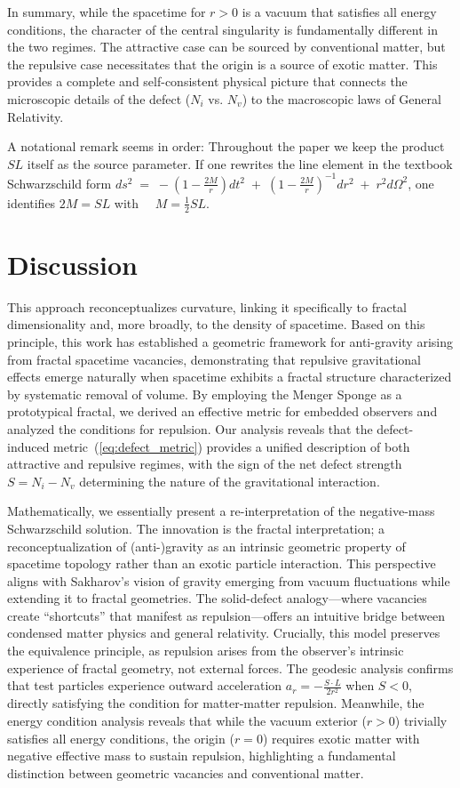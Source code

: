 \documentclass[%
  reprint,
  superscriptaddress,
  showpacs,
  showkeys,
  amsmath,amssymb,
  pra,
  longbibliography,
  floatfix,
  x11names
]{revtex4-2}
\begin{document}
In summary, while the spacetime for $r>0$ is a vacuum that satisfies all energy conditions, the character of the central singularity is fundamentally different in the two regimes. The attractive case can be sourced by conventional matter, but the repulsive case necessitates that the origin is a source of exotic matter. This provides a complete and self-consistent physical picture that connects the microscopic details of the defect ($N_i$ vs. $N_v$) to the macroscopic laws of General Relativity.

A notational remark seems in order:
Throughout the paper we keep the product $SL$ itself as the source parameter.
If one rewrites the line element in the textbook Schwarzschild form
$ds^{2} \;=\;
- \left(1-\frac{2M}{r}\right) dt^{2}
\;+\;
\left(1-\frac{2M}{r}\right)^{-1} dr^{2}
\;+\;
r^{2} d\Omega^{2}$,
one identifies
$
2M = SL$ with $\quad M=\tfrac12 SL $.

\section{Discussion}
\label{sec:discuss}

This approach reconceptualizes curvature, linking it specifically to fractal dimensionality and, more broadly, to the density of spacetime.
Based on this principle, this work has established a geometric framework for anti-gravity arising from fractal spacetime vacancies,
demonstrating that repulsive gravitational effects emerge naturally when spacetime exhibits a fractal structure characterized by systematic removal of volume. By employing the Menger Sponge as a prototypical fractal, we derived an effective metric for embedded observers and analyzed the conditions for repulsion. Our analysis reveals that the defect-induced metric~(\ref{eq:defect_metric}) provides a unified description of both attractive and repulsive regimes, with the sign of the net defect strength $S = N_i - N_v$ determining the nature of the gravitational interaction.

Mathematically, we essentially present a re-interpretation of the negative-mass Schwarzschild solution.
The innovation is the fractal interpretation;
a reconceptualization of (anti-)gravity as an intrinsic geometric property of spacetime topology rather than an exotic particle interaction.
This perspective aligns with Sakharov's vision of gravity emerging from vacuum fluctuations while extending it to fractal geometries.
The solid-defect analogy---where vacancies create ``shortcuts'' that manifest as repulsion---offers an intuitive bridge between condensed matter physics and general relativity. Crucially, this model preserves the equivalence principle, as repulsion arises from the observer's intrinsic experience of fractal geometry, not external forces. The geodesic analysis confirms that test particles experience outward acceleration $a_r = -\frac{S \cdot L}{2r^2}$ when $S < 0$, directly satisfying the condition for matter-matter repulsion. Meanwhile, the energy condition analysis reveals that while the vacuum exterior ($r > 0$) trivially satisfies all energy conditions, the origin ($r = 0$) requires exotic matter with negative effective mass to sustain repulsion, highlighting a fundamental distinction between geometric vacancies and conventional matter.
\end{document}

